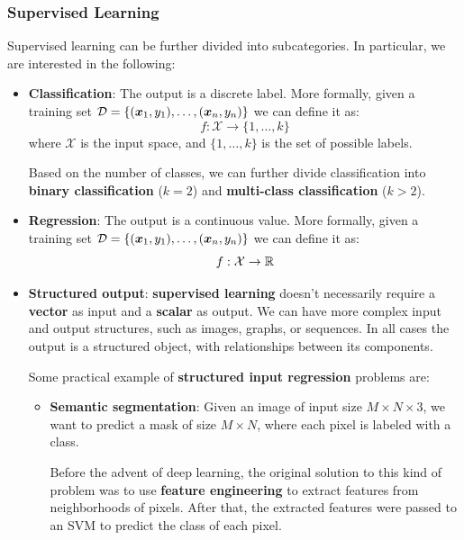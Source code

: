 \subsubsection{Supervised Learning}
Supervised learning can be further divided into subcategories. In particular, we are interested in the following:
\begin{itemize}
    \item \textbf{Classification}: The output is a discrete label. More formally, given a training set $\mathcal{D} = \{(\boldsymbol{x}_1, y_1), \dots, (\boldsymbol{x}_n, y_n)\}$ we can define it as:
    \begin{equation}
        f: \mathcal{X} \rightarrow \{1,\dots,k\}
    \end{equation}
    where $\mathcal{X}$ is the input space, and $\{1,\dots,k\}$ is the set of possible labels.
    
    Based on the number of classes, we can further divide classification into \textbf{binary classification} ($k=2$) and \textbf{multi-class classification} ($k>2$).
    
    \item \textbf{Regression}: The output is a continuous value. More formally, given a training set $\mathcal{D} = \{(\boldsymbol{x}_1, y_1), \dots, (\boldsymbol{x}_n, y_n)\}$ we can define it as:
    \begin{equation}
        f: \mathcal{X} \rightarrow \mathbb{R}
    \end{equation}
    
    \item \textbf{Structured output}: \textbf{supervised learning} doesn't necessarily require a \textbf{vector} as input and a \textbf{scalar} as output.
    We can have more complex input and output structures, such as images, graphs, or sequences.
    In all cases the output  is a structured object, with relationships between its components.
    
    Some practical example of \textbf{structured input regression} problems are:
    \begin{itemize}
        \item \textbf{Semantic segmentation}: Given an image of input size $M \times N \times 3$, we
        want to predict a mask of size $M \times N$, where each pixel is labeled with a class.
        
        Before the advent of deep learning, the original solution to this kind of problem was to use 
        \textbf{feature engineering} to extract features from neighborhoods of pixels. After that,
        the extracted features were passed to an SVM to predict the class of each pixel.
        

\end{itemize}
\end{itemize}
